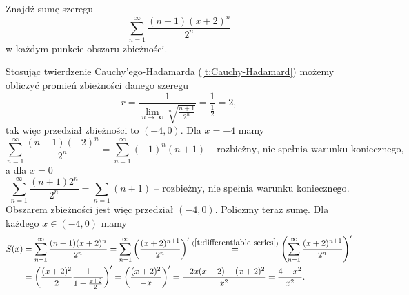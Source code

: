\begin{example}
    Znajdź sumę szeregu
    \[ \sum_{n=1}^\infty\frac{(n+1)(x+2)^n}{2^n} \]
    w każdym punkcie obszaru zbieżności.
\end{example}
\begin{solution}
    Stosując twierdzenie Cauchy'ego-Hadamarda (\ref{t:Cauchy-Hadamard}) możemy obliczyć promień zbieżności danego szeregu
    \[ r = \frac{1}{\lim\limits_{n\to\infty}\sqrt[n]{\frac{n+1}{2^n}}} = \frac{1}{\frac{1}{2}} = 2, \]
    tak więc przedział zbieżności to $(-4, 0)$.
    Dla $x = -4$ mamy
    \[ \sum_{n=1}^\infty\frac{(n+1)(-2)^n}{2^n} = \sum_{n=1}^\infty(-1)^n(n+1) \text{ -- rozbieżny, nie spełnia warunku koniecznego}, \]
    a dla $x = 0$
    \[ \sum_{n=1}^\infty\frac{(n+1)2^n}{2^n} = \sum_{n=1}(n+1) \text{ -- rozbieżny, nie spełnia warunku koniecznego}. \]
    Obszarem zbieżności jest więc przedział $(-4, 0)$. Policzmy teraz sumę. Dla każdego $x \in (-4, 0)$ mamy
    \begin{align*}
        S(x) &= \sum_{n=1}^\infty\frac{(n+1)(x+2)^n}{2^n} = \sum_{n=1}^\infty \left(\frac{(x+2)^{n+1}}{2^n}\right)' \overset{(\ref{t:differentiable series})}{=} \left(\sum_{n=1}^\infty\frac{(x+2)^{n+1}}{2^n}\right)' \\
        &= \left(\frac{(x+2)^2}{2}\frac{1}{1 - \frac{x+2}{2}}\right)' = \left(\frac{(x+2)^2}{-x}\right)' = \frac{-2x(x+2) + (x+2)^2}{x^2} = \frac{4 - x^2}{x^2}.
    \end{align*}
\end{solution}

